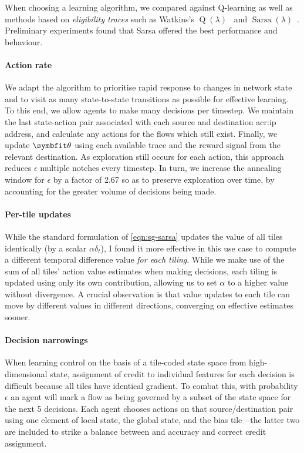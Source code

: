 When choosing a learning algorithm, we compared against Q-learning as well as methods based on \emph{eligibility traces} such as Watkins's $\operatorname{Q}(\lambda)$~\parencite[pp. 312--314]{RL2E} and $\operatorname{Sarsa}(\lambda)$~\parencite[p. 305]{RL2E}.
Preliminary experiments found that Sarsa offered the best performance and behaviour.

\paragraph{Action rate}
We adapt the algorithm to prioritise rapid response to changes in network state and to visit as many state-to-state transitions as possible for effective learning.
To this end, we allow agents to make many decisions per timestep.
We maintain the last state-action pair associated with each source and destination \gls{acr:ip} address, and calculate any actions for the flows which still exist.
Finally, we update $\wvec{}$ using each available trace and the reward signal from the relevant destination.
As exploration still occurs for each action, this approach reduces $\epsilon$ multiple notches every timestep.
In turn, we increase the annealing window for $\epsilon$ by a factor of \num{2.67} so as to preserve exploration over time, by accounting for the greater volume of decisions being made.

\paragraph{Per-tile updates}
While the standard formulation of \cref{eqn:sg-sarsa} updates the value of all tiles identically (by a scalar $\alpha \delta_t$), I found it more effective in this use case to compute a different temporal difference value \emph{for each tiling}.
While we make use of the sum of all tiles' action value estimates when making decisions, each tiling is updated using only its own contribution, allowing us to set $\alpha$ to a higher value without divergence.
A crucial observation is that value updates to each tile can move by different values in different directions, converging on effective estimates sooner.

\paragraph{Decision narrowings}
When learning control on the basis of a tile-coded state space from high-dimensional state, assignment of credit to individual features for each decision is difficult because all tiles have identical gradient.
To combat this, with probability $\epsilon$ an agent will mark a flow as being governed by a subset of the state space for the next \num{5} decisions.
Each agent chooses actions on that source/destination pair using one element of local state, the global state, and the bias tile---the latter two are included to strike a balance between and accuracy and correct credit assignment.

